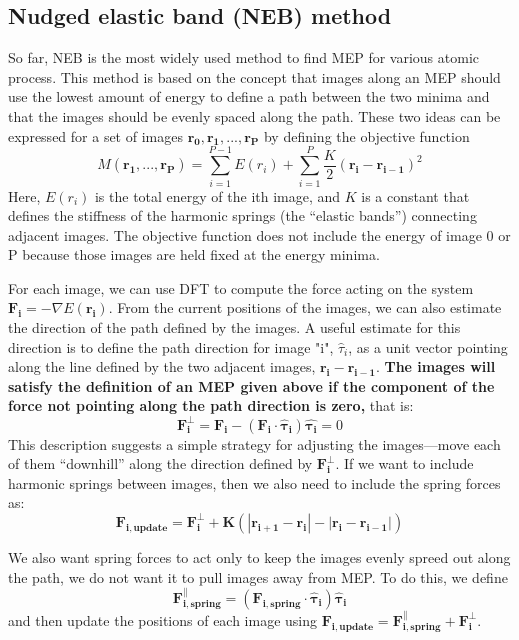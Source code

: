 \documentclass[12pt]{article}
\begin{document}
\subsection{Nudged elastic band (NEB) method}
So far, NEB is the most widely used method to find MEP for various atomic process. This method is based on the concept that images along an MEP should use the lowest amount of energy to define a path between the two minima and that the images should be evenly spaced along the path. These two ideas can be expressed for a set of images $\boldsymbol{r_0,r_1,...,r_P}$ by defining the objective function
\begin{equation}
    M(\boldsymbol{r_1,...,r_P})=\sum_{i=1}^{P-1}E(r_i)+\sum_{i=1}^P\frac{K}{2}(\boldsymbol{r_i}-\boldsymbol{r_{i-1}})^2
\end{equation}
Here, $E(r_i)$ is the total energy of the ith image, and $K$ is a constant that defines the stiffness of
the harmonic springs (the “elastic bands”) connecting adjacent images. The objective function does not include the energy of image 0 or P because those images are held fixed at the energy minima.

For each image, we can use DFT to compute the force acting on the system $\boldsymbol{F_i}=-\nabla E(\boldsymbol{r_i})$. From the current positions of the images, we can also estimate the direction of the path defined by the images. A useful estimate for this direction is to define the path direction for image "i", $\hat \tau_i$, as a unit vector pointing along the line defined by the two adjacent images, $\boldsymbol{r_i-r_{i-1}}$. \textbf{The images will satisfy the definition of an MEP given above if the
component of the force not pointing along the path direction is zero,} that is:
\begin{equation}
    \boldsymbol{F_i^\bot=F_i-(F_i\cdot \hat\tau_i)\hat{\tau_i}}=0
\end{equation}
This description suggests a simple strategy for adjusting the images—move each of them “downhill” along the direction defined by $\boldsymbol{F_i^\bot}$. If we want to include harmonic springs between images, then we also need to include the spring forces as:
\begin{equation}
\boldsymbol{F_{i,update}=F_i^\bot+K(|r_{i+1}-r_i|-|r_i-r_{i-1}|)}
\end{equation}

We also want spring forces to act only to keep the images evenly spreed out along the path, we do not want it to pull images away from MEP. To do this, we define
\begin{equation}
    \boldsymbol{F_{i,spring}^\parallel=(F_{i,spring}\cdot\hat{\tau}_i)\hat{\tau}_i}
\end{equation}
and then update the positions of each image using $\boldsymbol{F_{i,update}=F_{i,spring}^\parallel+F_{i}^\bot}.$
\end{document}

